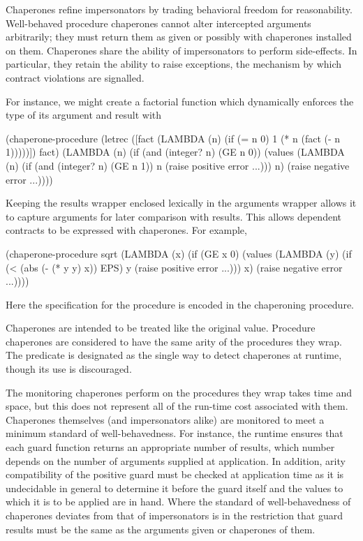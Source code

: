 \documentclass{sigplanconf}
\begin{document}
Chaperones refine impersonators by trading behavioral freedom for reasonability.
Well-behaved procedure chaperones cannot alter intercepted arguments arbitrarily; they must return them as given or possibly with chaperones installed on them.
Chaperones share the ability of impersonators to perform side-effects.
In particular, they retain the ability to raise exceptions, the mechanism by which contract violations are signalled.

For instance, we might create a factorial function which dynamically enforces the type of its argument and result with
\begin{schemedisplay}
(chaperone-procedure
 (letrec ([fact (LAMBDA (n)
                  (if (= n 0)
                      1
                      (* n (fact (- n 1)))))])
   fact)
 (LAMBDA (n)
   (if (and (integer? n) (GE n 0))
       (values (LAMBDA (n)
                 (if (and (integer? n) (GE n 1))
                     n
                     (raise positive error ...)))
               n)
       (raise negative error ...))))
\end{schemedisplay}
Keeping the results wrapper enclosed lexically in the arguments wrapper allows it to capture arguments for later comparison with results.
This allows dependent contracts to be expressed with chaperones.
For example,
\begin{schemedisplay}
(chaperone-procedure
 sqrt
 (LAMBDA (x)
   (if (GE x 0)
       (values (LAMBDA (y)
                 (if (< (abs (- (* y y) x)) EPS)
                     y
                     (raise positive error ...)))
               x)
       (raise negative error ...))))
\end{schemedisplay}
Here the specification for the  procedure is encoded in the chaperoning procedure.

Chaperones are intended to be treated like the original value.
Procedure chaperones are considered to have the same arity of the procedures they wrap.
The  predicate is designated as the single way to detect chaperones at runtime, though its use is discouraged.

The monitoring chaperones perform on the procedures they wrap takes time and space, but this does not represent all of the run-time cost associated with them.
Chaperones themselves (and impersonators alike) are monitored to meet a minimum standard of well-behavedness.
For instance, the runtime ensures that each guard function returns an appropriate number of results, which number depends on the number of arguments supplied at application.
In addition, arity compatibility of the positive guard must be checked at application time as it is undecidable in general to determine it before the guard itself and the values to which it is to be applied are in hand.
Where the standard of well-behavedness of chaperones deviates from that of impersonators is in the restriction that guard results must be the same as the arguments given or chaperones of them.
\end{document}
